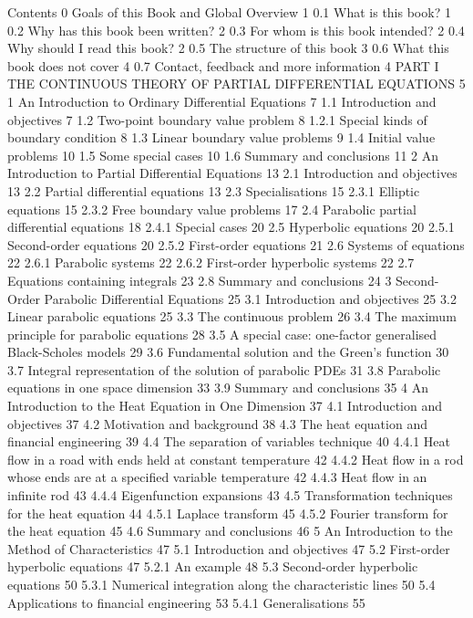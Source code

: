 Contents
0 Goals of this Book and Global Overview 1
0.1 What is this book? 1
0.2 Why has this book been written? 2
0.3 For whom is this book intended? 2
0.4 Why should I read this book? 2
0.5 The structure of this book 3
0.6 What this book does not cover 4
0.7 Contact, feedback and more information 4
PART I THE CONTINUOUS THEORY OF PARTIAL
DIFFERENTIAL EQUATIONS 5
1 An Introduction to Ordinary Differential Equations 7
1.1 Introduction and objectives 7
1.2 Two-point boundary value problem 8
1.2.1 Special kinds of boundary condition 8
1.3 Linear boundary value problems 9
1.4 Initial value problems 10
1.5 Some special cases 10
1.6 Summary and conclusions 11
2 An Introduction to Partial Differential Equations 13
2.1 Introduction and objectives 13
2.2 Partial differential equations 13
2.3 Specialisations 15
2.3.1 Elliptic equations 15
2.3.2 Free boundary value problems 17
2.4 Parabolic partial differential equations 18
2.4.1 Special cases 20
2.5 Hyperbolic equations 20
2.5.1 Second-order equations 20
2.5.2 First-order equations 21
2.6 Systems of equations 22
2.6.1 Parabolic systems 22
2.6.2 First-order hyperbolic systems 22
2.7 Equations containing integrals 23
2.8 Summary and conclusions 24
3 Second-Order Parabolic Differential Equations 25
3.1 Introduction and objectives 25
3.2 Linear parabolic equations 25
3.3 The continuous problem 26
3.4 The maximum principle for parabolic equations 28
3.5 A special case: one-factor generalised Black-Scholes models 29
3.6 Fundamental solution and the Green's function 30
3.7 Integral representation of the solution of parabolic PDEs 31
3.8 Parabolic equations in one space dimension 33
3.9 Summary and conclusions 35
4 An Introduction to the Heat Equation in One Dimension 37
4.1 Introduction and objectives 37
4.2 Motivation and background 38
4.3 The heat equation and financial engineering 39
4.4 The separation of variables technique 40
4.4.1 Heat flow in a road with ends held at constant temperature 42
4.4.2 Heat flow in a rod whose ends are at a specified
variable temperature 42
4.4.3 Heat flow in an infinite rod 43
4.4.4 Eigenfunction expansions 43
4.5 Transformation techniques for the heat equation 44
4.5.1 Laplace transform 45
4.5.2 Fourier transform for the heat equation 45
4.6 Summary and conclusions 46
5 An Introduction to the Method of Characteristics 47
5.1 Introduction and objectives 47
5.2 First-order hyperbolic equations 47
5.2.1 An example 48
5.3 Second-order hyperbolic equations 50
5.3.1 Numerical integration along the characteristic lines 50
5.4 Applications to financial engineering 53
5.4.1 Generalisations 55
